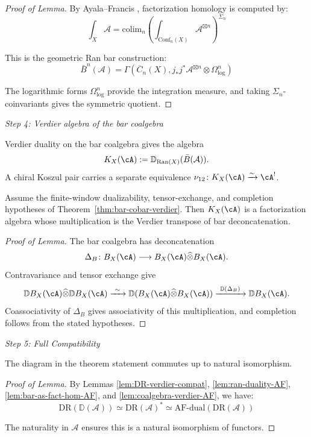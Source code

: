 \begin{proof}[Proof of Lemma]
By Ayala--Francis \cite[Theorem 4.19]{AF15}, factorization homology is computed by:
\[\int_X \mathcal{A} = \text{colim}_n \left(\int_{\text{Conf}_n(X)}
\mathcal{A}^{\boxtimes n}\right)^{\Sigma_n}\]

This is the geometric Ran bar construction:
\[\bar{B}^n(\mathcal{A}) = \Gamma(\overline{C}_n(X), j_* j^* \mathcal{A}^{\boxtimes n}
\otimes \Omega^n_{\log})\]

The logarithmic forms $\Omega^n_{\log}$ provide the integration measure, and taking
$\Sigma_n$-coinvariants gives the symmetric quotient.
\end{proof}

\emph{Step 4: Verdier algebra of the bar coalgebra}

Verdier duality on the bar coalgebra gives the algebra
\[
K_X(\cA):=\mathbb{D}_{\text{Ran}(X)}(\bar{B}(\mathcal{A})).
\]
A chiral Koszul pair carries a separate equivalence
$\nu_{12}\colon K_X(\cA)\xrightarrow{\sim}\cA^!$.

\begin{lemma}\label{lem:coalgebra-verdier-AF}
Assume the finite-window dualizability, tensor-exchange, and
completion hypotheses of Theorem~\ref{thm:bar-cobar-verdier}.
Then $K_X(\cA)$ is a factorization algebra whose multiplication is the
Verdier transpose of bar deconcatenation.
\end{lemma}

\begin{proof}[Proof of Lemma]
The bar coalgebra has deconcatenation
\[
 \Delta_B\colon B_X(\cA)\longrightarrow
 B_X(\cA)\widehat\otimes B_X(\cA).
\]
Contravariance and tensor exchange give
\[
 \mathbb D B_X(\cA)\widehat\otimes\mathbb D B_X(\cA)
 \xrightarrow{\ \sim\ }
 \mathbb D(B_X(\cA)\widehat\otimes B_X(\cA))
 \xrightarrow{\ \mathbb D(\Delta_B)\ }
 \mathbb D B_X(\cA).
\]
Coassociativity of $\Delta_B$ gives associativity of this
multiplication, and completion follows from the stated hypotheses.
\end{proof}

\emph{Step 5: Full Compatibility}

\begin{lemma}\label{lem:diagram-commutes-AF}
The diagram in the theorem statement commutes up to natural isomorphism.
\end{lemma}

\begin{proof}[Proof of Lemma]
By Lemmas \ref{lem:DR-verdier-compat}, \ref{lem:ran-duality-AF}, \ref{lem:bar-as-fact-hom-AF}, and
\ref{lem:coalgebra-verdier-AF}, we have:
\[\text{DR}(\mathbb{D}(\mathcal{A})) \simeq \text{DR}(\mathcal{A})^*
\simeq \text{AF-dual}(\text{DR}(\mathcal{A}))\]

The naturality in $\mathcal{A}$ ensures this is a natural isomorphism of functors.
\end{proof}

